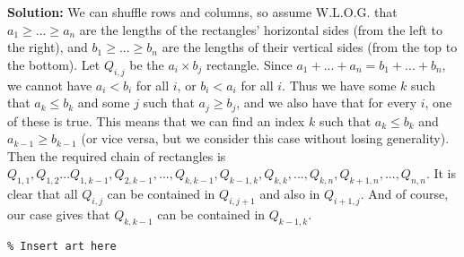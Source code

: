 \documentclass{article}
\begin{document}
\begin{enumerate}[itemsep=\fill]
\textbf{Solution:} We can shuffle rows and columns, so assume W.L.O.G. that $a_1\geq ... \geq a_n$ are the lengths of the rectangles' horizontal sides (from the left to the right), and $b_1\geq ...\geq b_n$ are the lengths of their vertical sides (from the top to the bottom). Let $Q_{i,j}$ be the $a_i\times b_j$ rectangle. Since $a_1+...+a_n=b_1+...+b_n$, we cannot have $a_i<b_i$ for all $i$, or $b_i<a_i$ for all $i$. Thus we have some $k$ such that $a_k\leq b_k$ and some $j$ such that $a_j\geq b_j$, and we also have that for every $i$, one of these is true. This means that we can find an index $k$ such that $a_k\leq b_k$ and $a_{k-1}\geq b_{k-1}$ (or vice versa, but we consider this case without losing generality). Then the required chain of rectangles is $Q_{1,1},Q_{1,2}...Q_{1,k-1},Q_{2,k-1},...,Q_{k,k-1},Q_{k-1,k},Q_{k,k},...,Q_{k,n},Q_{k+1,n},...,Q_{n,n}$. It is clear that all $Q_{i,j}$ can be contained in $Q_{i,j+1}$ and also in $Q_{i+1,j}$. And of course, our case gives that $Q_{k,k-1}$ can be contained in $Q_{k-1,k}$.


\end{enumerate}


\centering
\small
\begin{BVerbatim}
\end{BVerbatim}
\end{document}
